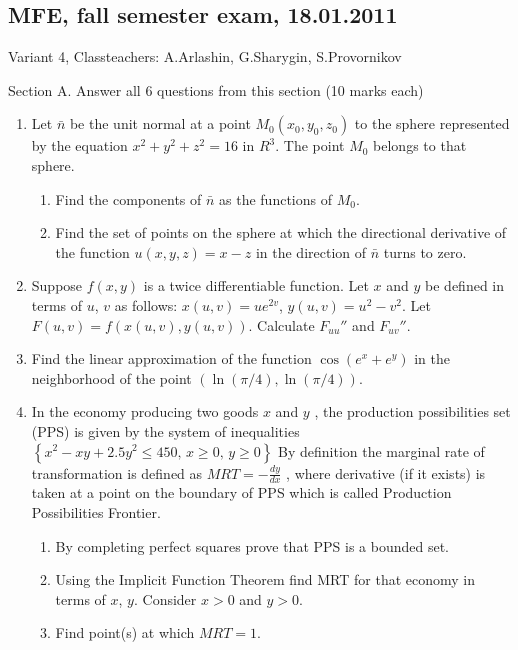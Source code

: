 \subsection{MFE, fall semester exam, 18.01.2011}

Variant 4, Classteachers: A.Arlashin, G.Sharygin, S.Provornikov

Section A.
Answer all 6 questions from this section (10 marks each)

\begin{enumerate}
\item Let $\bar{n}$ be the unit normal at a point $M_0( x_0 , y_0 , z_0 )$ to the sphere represented by the equation $x^2+y^2+z^2=16$ in $R^3$. The point $M_0$ belongs to that sphere.
\begin{enumerate}
\item Find the components of $\bar{n}$ as the functions of $M_0$.
\item Find the set of points on the sphere at which the directional derivative of the function $u( x, y, z )=x-z$ in the direction of $\bar{n}$ turns to zero.
\end{enumerate}

\item Suppose $f(x,y)$ is a twice differentiable function. Let $x$ and $y$ be defined in terms of $u$, $v$ as follows: $x(u,v)=ue^{2v}$, $y(u,v)=u^2-v^2$. Let $F(u,v)=f(x(u, v), y(u, v))$.
Calculate $F_{uu}''$ and $F_{uv}''$.
\item Find the linear approximation of the function $\cos(e^x+e^y)$ in the neighborhood of the point $(\ln (\pi/4), \ln (\pi/4))$.

\item In the economy producing two goods $x$ and $y$ , the production possibilities set (PPS) is given by the system of inequalities
$ \left\{ x^2-xy+2.5y^2\leq 450, \, x\geq 0, \, y\geq 0 \right\} $
By definition the marginal rate of transformation is defined as
$ MRT=-\frac{dy}{dx}$
, where derivative (if it exists) is taken at a point on the boundary of PPS which is called Production Possibilities Frontier.
\begin{enumerate}
\item  By completing perfect squares prove that PPS is a bounded set.
\item Using the Implicit Function Theorem find MRT for that economy in terms of $x$, $y$. Consider $x>0$ and $y>0$.
\item Find point(s) at which $MRT=1$.
\end{enumerate}


\end{enumerate}
